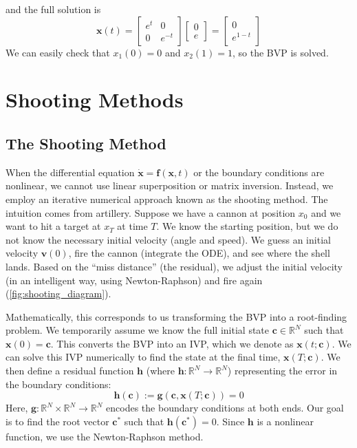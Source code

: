 \begin{exampleBox}
\begin{equation}
    \end{equation}
    and the full solution is
    \begin{equation}
        \mathbf{x}(t) = 
        \begin{bmatrix}e^{t} & 0\\[4pt] 0 & e^{-t}\end{bmatrix}
        \begin{bmatrix}0\\[4pt] e\end{bmatrix}
        =
        \begin{bmatrix}0\\[4pt] e^{1-t}\end{bmatrix}
    \end{equation}
    We can easily check that $x_1(0) = 0$ and $x_2(1) = 1$, so the BVP is solved.

\end{exampleBox}

\section{Shooting Methods}

\subsection{The Shooting Method}

When the differential equation $\dot{\mathbf{x}} = \mathbf{f}(\mathbf{x}, t)$ or the boundary conditions are nonlinear, we cannot use linear superposition or matrix inversion. Instead, we employ an iterative numerical approach known as the shooting method. The intuition comes from artillery. Suppose we have a cannon at position $x_0$ and we want to hit a target at $x_T$ at time $T$. We know the starting position, but we do not know the necessary initial velocity (angle and speed). We guess an initial velocity $\mathbf{v}(0)$, fire the cannon (integrate the ODE), and see where the shell lands. Based on the ``miss distance'' (the residual), we adjust the initial velocity (in an intelligent way, using Newton-Raphson) and fire again (\autoref{fig:shooting_diagram}).

Mathematically, this corresponds to us transforming the BVP into a root-finding problem. We temporarily assume we know the full initial state $\mathbf{c} \in \mathbb{R}^N$ such that $\mathbf{x}(0) = \mathbf{c}$. This converts the BVP into an IVP, which we denote as $\mathbf{x}(t; \mathbf{c})$. We can solve this IVP numerically to find the state at the final time, $\mathbf{x}(T; \mathbf{c})$. We then define a residual function $\mathbf{h}$ (where $\mathbf{h}: \mathbb{R}^N \to \mathbb{R}^N$) representing the error in the boundary conditions:
\begin{equation}
    \mathbf{h}(\mathbf{c}) := \mathbf{g}(\mathbf{c}, \mathbf{x}(T; \mathbf{c})) = 0
\end{equation}
Here, $\mathbf{g} : \mathbb{R}^N \times \mathbb{R}^N \to \mathbb{R}^N$ encodes the boundary conditions at both ends. Our goal is to find the root vector $\mathbf{c}^*$ such that $\mathbf{h}(\mathbf{c}^*) = 0$. Since $\mathbf{h}$ is a nonlinear function, we use the Newton-Raphson method.

